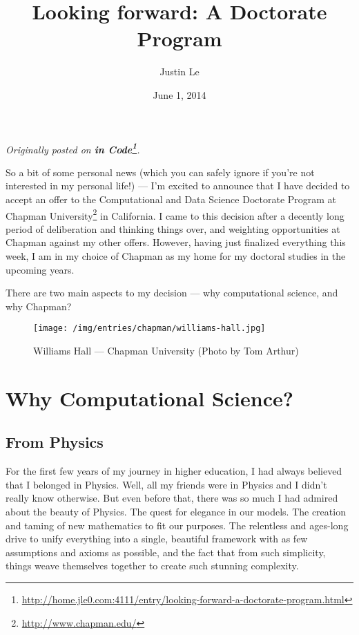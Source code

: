 \documentclass[]{article}
\title{Looking forward: A Doctorate Program}
\author{Justin Le}
\date{June 1, 2014}
\renewcommand{\href}[2]{#2\footnote{\url{#1}}}
\begin{document}
\maketitle

\emph{Originally posted on
\textbf{\href{http://home.jle0.com:4111/entry/looking-forward-a-doctorate-program.html}{in
Code}}.}

So a bit of some personal news (which you can safely ignore if you're not
interested in my personal life!) --- I'm excited to announce that I have decided
to accept an offer to the Computational and Data Science Doctorate Program at
\href{http://www.chapman.edu/}{Chapman University} in California. I came to this
decision after a decently long period of deliberation and thinking things over,
and weighting opportunities at Chapman against my other offers. However, having
just finalized everything this week, I am in my choice of Chapman as my home for
my doctoral studies in the upcoming years.

There are two main aspects to my decision --- why computational science, and why
Chapman?

\begin{figure}[htbp]
\centering
\texttt{[image: /img/entries/chapman/williams-hall.jpg]}
\caption{Williams Hall --- Chapman University (Photo by Tom Arthur)}
\end{figure}

\section{Why Computational Science?}\label{why-computational-science}

\subsection{From Physics}\label{from-physics}

For the first few years of my journey in higher education, I had always believed
that I belonged in Physics. Well, all my friends were in Physics and I didn't
really know otherwise. But even before that, there was so much I had admired
about the beauty of Physics. The quest for elegance in our models. The creation
and taming of new mathematics to fit our purposes. The relentless and ages-long
drive to unify everything into a single, beautiful framework with as few
assumptions and axioms as possible, and the fact that from such simplicity,
things weave themselves together to create such stunning complexity.
\end{document}
